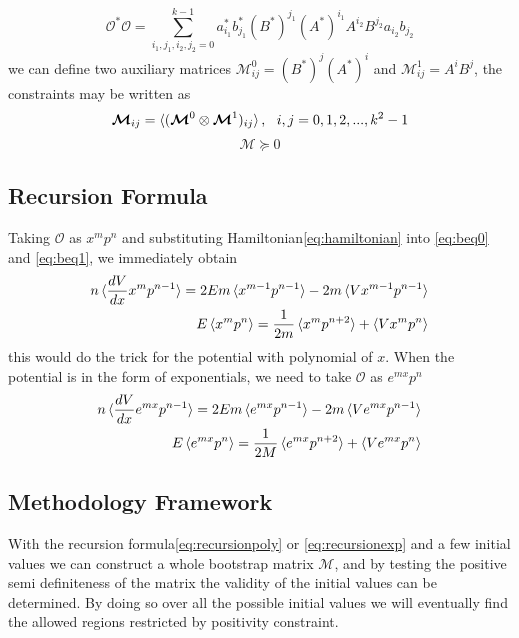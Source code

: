 \documentclass[aps, preprint,amsmath, amssymb]{revtex4-2}
\begin{document}
\begin{equation}
	\mathcal{O}^* \mathcal{O} = \sum_{i_1, j_1, i_2, j_2 = 0}^{k - 1} a_{i_1}^* b_{j_1}^* (B^*)^{j_1} (A^*)^{i_1} A^{i_2} B^{j_2} a_{i_2} b_{j_2}
\end{equation}
we can define two auxiliary matrices $\bm{\mathcal{M}}_{ij}^0 = (B^*)^j (A^*)^i$ and $\bm{\mathcal{M}}_{ij}^1 = A^i B^j$, the constraints may be written as
\begin{equation}
	\bm{\mathcal{M}}_{ij} = \braket{(\bm{\mathcal{M}}^0 \otimes \bm{\mathcal{M}}^1)_{ij}}, \ \ i, j = 0, 1, 2, ..., k^2 - 1
\end{equation}
\begin{equation}
	\bm{\mathcal{M}} \succeq 0
\end{equation}

\subsection{Recursion Formula}
Taking $\mathcal{O}$ as $x^m p^n$ and substituting Hamiltonian\eqref{eq:hamiltonian} into \eqref{eq:beq0} and \eqref{eq:beq1}, we immediately obtain
\begin{align}
	n \braket{\frac{d V}{d x} x^m p^{n - 1}} = 2E m \braket{x^{m - 1} p^{n - 1}} - 2m\braket{V x^{m - 1} p^{n - 1}} \notag \\
	E\braket{x^m p^n} = \frac1{2m}\braket{x^m p^{n + 2}} + \braket{V x^m p^n} \label{eq:recursionpoly}
\end{align}
this would do the trick for the potential with polynomial of $x$. When the potential is in the form of exponentials, we need to take $\mathcal{O}$ as $e^{mx} p^n$
\begin{align}
	n \braket{\frac{d V}{d x} e^{m x} p^{n - 1}} = 2Em\braket{e^{mx} p^{n - 1}} - 2m\braket{V e^{mx} p^{n - 1}}\notag \\
	E \braket{e^{mx} p^n} = \frac1{2M}\braket{e^{mx} p^{n + 2}} + \braket{Ve^{mx} p^n} \label{eq:recursionexp}
\end{align}

\subsection{Methodology Framework}
With the recursion formula\eqref{eq:recursionpoly} or \eqref{eq:recursionexp} and a few initial values we can construct a whole bootstrap matrix $\bm{\mathcal{M}}$, and by testing the positive semi definiteness of the matrix the validity of the initial values can be determined. By doing so over all the possible initial values we will eventually find the allowed regions restricted by positivity constraint.
\end{document}

